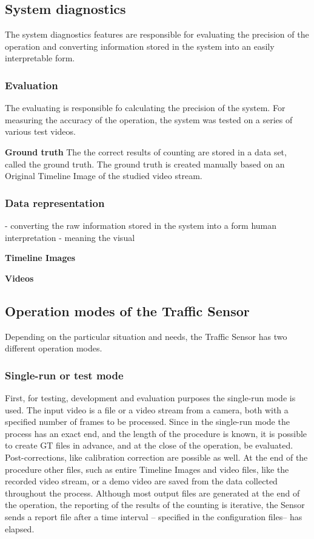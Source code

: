 \subsection{System diagnostics}
The system diagnostics features are responsible for evaluating the precision of the operation and converting information stored in the system into an easily interpretable form.

\subsubsection{Evaluation}
The evaluating is responsible fo calculating the precision of the system.
For measuring the accuracy of the operation, the system was tested on a series of various test videos.

\textbf{Ground truth}
The the correct results of counting are stored in a data set, called the ground truth.
The ground truth is created manually based on an Original Timeline Image of the studied video stream.
\subsubsection{Data representation}
- converting the raw information stored in the system into a form  human interpretation
- meaning the visual

\textbf{Timeline Images}

\textbf{Videos}
\subsection{Operation modes of the Traffic Sensor}
Depending on the particular situation and needs, the Traffic Sensor has two different operation modes.
\subsubsection{Single-run or test mode}\label{sec:run_modes}
First, for testing, development and evaluation purposes the single-run mode is used.
The input video is a file or a video stream from a camera, both with a specified number of frames to be processed.
Since in the single-run mode the process has an exact end, and the length of the procedure is known, it is possible to create GT files in advance, and at the close of the operation, be evaluated.
Post-corrections, like calibration correction are possible as well.
At the end of the procedure other files, such as entire Timeline Images and video files, like the recorded video stream, or a demo video are saved from the data collected throughout the process.
Although most output files are generated at the end of the operation, the reporting of the results of the counting is iterative, the Sensor sends a report file after a time interval -- specified in the configuration files-- has elapsed.

